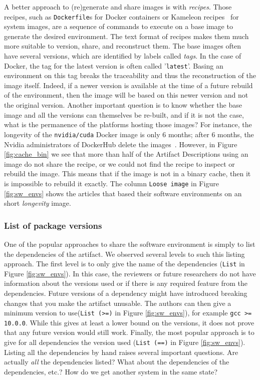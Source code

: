 \documentclass[sigconf,natbib=false]{acmart}
\newcommand{\ad}{Artifact Description}
\begin{document}
A better approach to (re)generate and share images is with \emph{recipes}.
Those recipes, such as \texttt{Dockerfile}s for Docker containers or Kameleon recipes~\cite{ruiz_reconstructable_2015} for system images, are a sequence of commands to execute on a base image to generate the desired environment.
The text format of recipes makes them much more suitable to version, share, and reconstruct them.
The base images often have several versions, which are identified by labels called \emph{tags}.
In the case of Docker, the tag for the latest version is often called '\texttt{latest}'.
Basing an environment on this tag breaks the traceability and thus the reconstruction of the image itself.
Indeed, if a newer version is available at the time of a future rebuild of the environment, then the image will be based on this newer version and not the original version.
Another important question is to know whether the base image and all the versions can themselves be re-built, and if it is not the case, what is the permanence of the platforms hosting those images?
For instance, the longevity of the \texttt{nvidia/cuda} Docker image is only 6 months; after 6 months, the Nvidia administrators of DockerHub delete the images\ \cite{nvidia_cuda_lifetime}.
However, in Figure \ref{fig:cache_bin} we see that more than half of the \ad s using an image do not share the recipe, or we could not find the recipe to inspect or rebuild the image.
This means that if the image is not in a binary cache, then it is impossible to rebuild it exactly.
The column \texttt{Loose image} in Figure \ref{fig:sw_envs} shows the articles that based their software environments on an short \emph{longevity} image.


\subsubsection{List of package versions}\label{sec:sop:sw:list}

One of the popular approaches to share the software environment is simply to list the dependencies of the artifact.
We observed several levels to such this listing approach.
The first level is to only give the name of the dependencies (\texttt{List} in Figure \ref{fig:sw_envs}).
In this case, the reviewers or future researchers do not have information about the versions used or if there is any required feature from the dependencies.
Future versions of a dependency might have introduced breaking changes that you make the artifact unusable.
The authors can then give a minimum version to use(\texttt{List (>=)} in Figure \ref{fig:sw_envs}), for example \texttt{gcc >= 10.0.0}.
While this gives at least a lower bound on the versions, it does not prove that any future version would still work.
Finally, the most popular approach is to give for all dependencies the version used (\texttt{List (==)} in Figure \ref{fig:sw_envs}).
Listing all the dependencies by hand raises several important questions.
Are actually \emph{all} the dependencies listed?
What about the dependencies of the dependencies, etc.?
How do we get another system in the same state?
\end{document}

